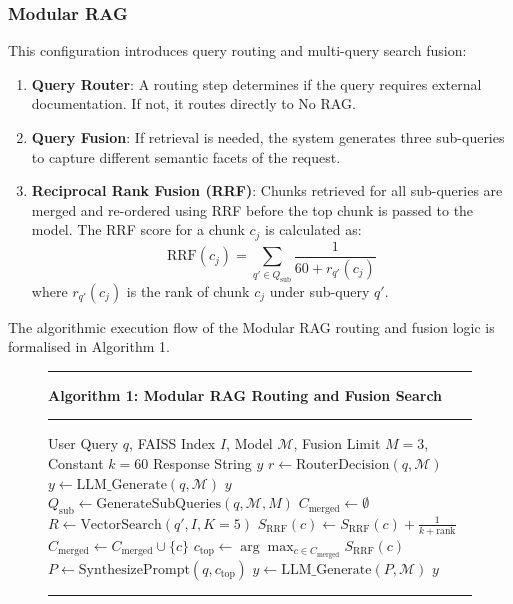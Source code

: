 \documentclass[conference]{IEEEtran}
\begin{document}
\subsubsection{Modular RAG}
This configuration introduces query routing and multi-query search fusion:
\begin{enumerate}
    \item \textbf{Query Router}: A routing step determines if the query requires external documentation. If not, it routes directly to No RAG.
    \item \textbf{Query Fusion}: If retrieval is needed, the system generates three sub-queries to capture different semantic facets of the request.
    \item \textbf{Reciprocal Rank Fusion (RRF)}: Chunks retrieved for all sub-queries are merged and re-ordered using RRF before the top chunk is passed to the model. The RRF score for a chunk $c_j$ is calculated as:
    \begin{equation}
    \text{RRF}(c_j) = \sum_{q' \in Q_{\text{sub}}} \frac{1}{60 + r_{q'}(c_j)}
    \end{equation}
    where $r_{q'}(c_j)$ is the rank of chunk $c_j$ under sub-query $q'$.
\end{enumerate}
The algorithmic execution flow of the Modular RAG routing and fusion logic is formalised in Algorithm 1.
\begin{figure}[htbp]
\hrule
\vspace{4pt}
\textbf{Algorithm 1: Modular RAG Routing and Fusion Search}
\vspace{2pt}
\hrule
\begin{algorithmic}[1]
\REQUIRE User Query $q$, FAISS Index $I$, Model $\mathcal{M}$, Fusion Limit $M=3$, Constant $k=60$
\ENSURE Response String $y$
\STATE $r \leftarrow \text{RouterDecision}(q, \mathcal{M})$
    \STATE $y \leftarrow \text{LLM\_Generate}(q, \mathcal{M})$
    \RETURN $y$
\ENDIF
\STATE $Q_{\text{sub}} \leftarrow \text{GenerateSubQueries}(q, \mathcal{M}, M)$
\STATE $C_{\text{merged}} \leftarrow \emptyset$
    \STATE $R \leftarrow \text{VectorSearch}(q', I, K=5)$
        \STATE $S_{\text{RRF}}(c) \leftarrow S_{\text{RRF}}(c) + \frac{1}{k + \text{rank}}$
        \STATE $C_{\text{merged}} \leftarrow C_{\text{merged}} \cup \{c\}$
    \ENDFOR
\ENDFOR
\STATE $c_{\text{top}} \leftarrow \arg\max_{c \in C_{\text{merged}}} S_{\text{RRF}}(c)$
\STATE $P \leftarrow \text{SynthesizePrompt}(q, c_{\text{top}})$
\STATE $y \leftarrow \text{LLM\_Generate}(P, \mathcal{M})$
\RETURN $y$
\end{algorithmic}
\hrule
\end{figure}
\end{document}
